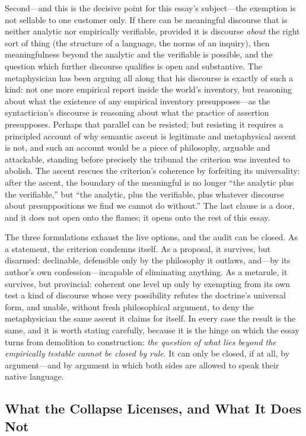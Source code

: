 Second---and this is the decisive point for this essay's subject---the exemption is not sellable to one customer only. If there can be meaningful discourse that is neither analytic nor empirically verifiable, provided it is discourse \emph{about} the right sort of thing (the structure of a language, the norms of an inquiry), then meaningfulness beyond the analytic and the verifiable is possible, and the question which further discourse qualifies is open and substantive. The metaphysician has been arguing all along that his discourse is exactly of such a kind: not one more empirical report inside the world's inventory, but reasoning about what the existence of any empirical inventory presupposes---as the syntactician's discourse is reasoning about what the practice of assertion presupposes. Perhaps that parallel can be resisted; but resisting it requires a principled account of why semantic ascent is legitimate and metaphysical ascent is not, and such an account would be a piece of philosophy, arguable and attackable, standing before precisely the tribunal the criterion was invented to abolish. The ascent rescues the criterion's coherence by forfeiting its universality: after the ascent, the boundary of the meaningful is no longer ``the analytic plus the verifiable,'' but ``the analytic, plus the verifiable, plus whatever discourse about presuppositions we find we cannot do without.'' The last clause is a door, and it does not open onto the flames; it opens onto the rest of this essay.

The three formulations exhaust the live options, and the audit can be closed. As a statement, the criterion condemns itself. As a proposal, it survives, but disarmed: declinable, defensible only by the philosophy it outlaws, and---by its author's own confession---incapable of eliminating anything. As a metarule, it survives, but provincial: coherent one level up only by exempting from its own test a kind of discourse whose very possibility refutes the doctrine's universal form, and unable, without fresh philosophical argument, to deny the metaphysician the same ascent it claims for itself. In every case the result is the same, and it is worth stating carefully, because it is the hinge on which the essay turns from demolition to construction: \emph{the question of what lies beyond the empirically testable cannot be closed by rule}. It can only be closed, if at all, by argument---and by argument in which both sides are allowed to speak their native language.

\subsection{What the Collapse Licenses, and What It Does Not}

